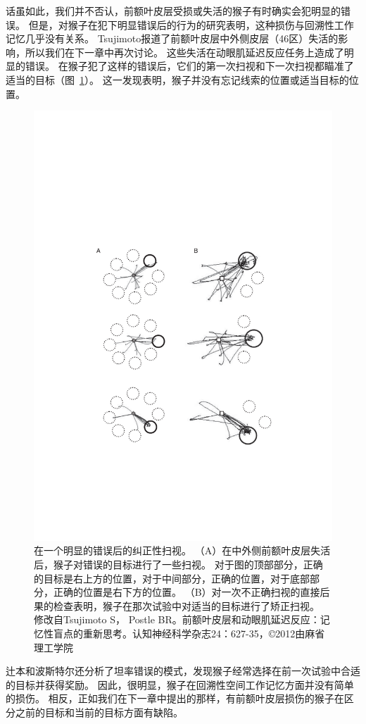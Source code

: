 话虽如此，我们并不否认，前额叶皮层受损或失活的猴子有时确实会犯明显的错误。
但是，对猴子在犯下明显错误后的行为的研究表明，这种损伤与回溯性工作记忆几乎没有关系。
Tsujimoto\cite{tsujimoto2012prefrontal}报道了前额叶皮层中外侧皮层（46区）失活的影响，所以我们在下一章中再次讨论。
这些失活在动眼肌延迟反应任务上造成了明显的错误。
在猴子犯了这样的错误后，它们的第一次扫视和下一次扫视都瞄准了适当的目标（图~\ref{fig:fig_5_8}）。
这一发现表明，猴子并没有忘记线索的位置或适当目标的位置。


\begin{figure}
	\centering
	\includegraphics[width=0.7\linewidth]{image_pfc/Fig_5_8}
	\caption{在一个明显的错误后的纠正性扫视。
		（A）在中外侧前额叶皮层失活后，猴子对错误的目标进行了一些扫视。
		对于图的顶部部分，正确的目标是右上方的位置，对于中间部分，正确的位置，对于底部部分，正确的位置是右下方的位置。
		（B）对一次不正确扫视的直接后果的检查表明，猴子在那次试验中对适当的目标进行了矫正扫视。
		修改自Tsujimoto S， Postle BR。前额叶皮层和动眼肌延迟反应：记忆性盲点的重新思考。认知神经科学杂志24：627-35，©2012由麻省理工学院}
	\label{fig:fig_5_8}
\end{figure}


辻本和波斯特尔还分析了坦率错误的模式，发现猴子经常选择在前一次试验中合适的目标并获得奖励。
因此，很明显，猴子在回溯性空间工作记忆方面并没有简单的损伤。
相反，正如我们在下一章中提出的那样，有前额叶皮层损伤的猴子在区分之前的目标和当前的目标方面有缺陷。



